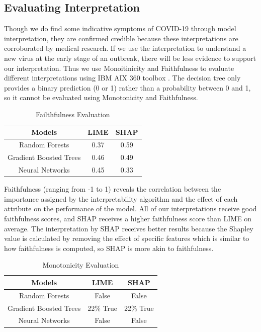 \newpage
\subsection{Evaluating Interpretation}

Though we do find some indicative symptoms of COVID-19 through model interpretation, they are confirmed credible because these interpretations are corroborated by medical research. If we use the interpretation to understand a new virus at the early stage of an outbreak, there will be less evidence to support our interpretation. Thus we use Monoitinicity and Faithfulness to evaluate different interpretations using IBM AIX 360 toolbox \citep{aix360-sept-2019}. The decision tree only provides a binary prediction (0 or 1) rather than a probability between 0 and 1, so it cannot be evaluated using Monotonicity and Faithfulness.

\begin{table}[H]
\centering
\caption{Failthfulness Evaluation}
\begin{tabular}{@{}ccc@{}}
\toprule
Models   & LIME & SHAP \\ \midrule
Random Forests & 0.37  & 0.59      \\
Gradient Boosted Trees & 0.46 & 0.49 \\
Neural Networks & 0.45 & 0.33 \\ \bottomrule
\end{tabular}
\end{table}

Faithfulness (ranging from -1 to 1) reveals the correlation between the importance assigned by the interpretability algorithm and the effect of each attribute on the performance of the model. All of our interpretations receive good faithfulness scores, and SHAP receives a higher faithfulness score than LIME on average. The interpretation by SHAP receives better results because the Shapley value is calculated by removing the effect of specific features which is similar to how faithfulness is computed, so SHAP is more akin to faithfulness.

\begin{table}[H]
\centering
\caption{Monotonicity Evaluation}
\begin{tabular}{@{}ccc@{}}
\toprule
Models   & LIME & SHAP \\ \midrule
Random Forests & False  & False      \\
Gradient Boosted Trees & 22\% True & 22\% True \\
Neural Networks & False & False \\ \bottomrule
\end{tabular}
\end{table}

